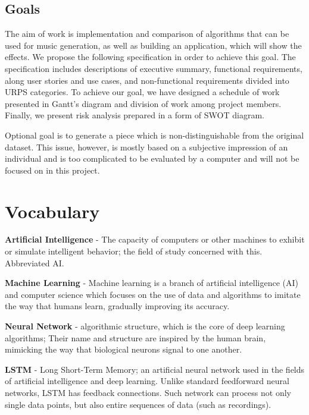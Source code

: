 \documentclass{article}
\begin{document}
\subsection{Goals}

The aim of work is implementation and comparison of algorithms that can be used for music generation, as well as building an application, which will show the effects. We propose the following specification in order to achieve this goal. The specification includes descriptions of executive summary, functional requirements, along user stories and use cases, and non-functional requirements divided into URPS categories. To achieve our goal, we have designed a schedule of work presented in Gantt's diagram and division of work among project members. Finally, we present risk analysis prepared in a form of SWOT diagram.

\noindent
Optional goal is to generate a piece which is non-distinguishable from the original dataset. This issue, however, is mostly based on a subjective impression of an individual and is too complicated to be evaluated by a computer and will not be focused on in this project.

\section{Vocabulary} \label{vocab}
\textbf{Artificial Intelligence} - The capacity of computers or other machines to exhibit or simulate intelligent behavior; the field of study concerned with this. Abbreviated AI. \cite{AI_OED}

\vskip5pt \noindent
\textbf{Machine Learning} - Machine learning is a branch of artificial intelligence (AI) and computer science which focuses on the use of data and algorithms to imitate the way that humans learn, gradually improving its accuracy. \cite{ML_IBM}

\vskip5pt \noindent
\textbf{Neural Network} - algorithmic structure, which is the core of deep learning algorithms; Their name and structure are inspired by the human brain, mimicking the way that biological neurons signal to one another. \cite{NN_IBM}

\vskip5pt \noindent
\textbf{LSTM} - Long Short-Term Memory; an artificial neural network used in the fields of artificial intelligence and deep learning. Unlike standard feedforward neural networks, LSTM has feedback connections. Such network can process not only single data points, but also entire sequences of data (such as recordings). \cite{LSTM}
\end{document}
